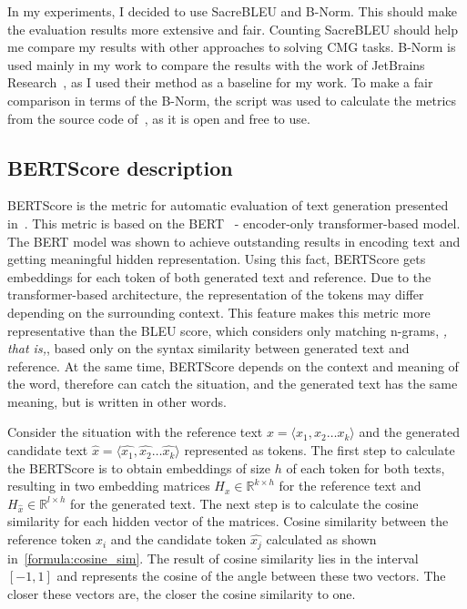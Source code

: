 In my experiments, I decided to use SacreBLEU and B-Norm. This should make the evaluation results more extensive and fair. Counting SacreBLEU should help me compare my results with other approaches to solving CMG tasks. B-Norm is used mainly in my work to compare the results with the work of JetBrains Research~\cite{eliseeva2023commit}, as I used their method as a baseline for my work. To make a fair comparison in terms of the B-Norm, the script was used to calculate the metrics from the source code of~\cite{eliseeva2023commit}, as it is open and free to use.

\subsection{BERTScore description}\label{subec:bertscore}
BERTScore is the metric for automatic evaluation of text generation presented in~\cite{zhang2019bertscore}. This metric is based on the BERT~\cite{devlin2018bert} {-} encoder-only transformer-based model. The BERT model was shown to achieve outstanding results in encoding text and getting meaningful hidden representation. Using this fact, BERTScore gets embeddings for each token of both generated text and reference. Due to the transformer-based architecture, the representation of the tokens may differ depending on the surrounding context. This feature makes this metric more representative than the BLEU score, which considers only matching n-grams, \textit{, that is,}, based only on the syntax similarity between generated text and reference. At the same time, BERTScore depends on the context and meaning of the word, therefore can catch the situation, and the generated text has the same meaning, but is written in other words.

Consider the situation with the reference text $x = \langle x_1, x_2 \dots x_k \rangle$ and the generated candidate text $\hat{x} = \langle \hat{x_1}, \hat{x_2} \dots \hat{x_k} \rangle$ represented as tokens. The first step to calculate the BERTScore is to obtain embeddings of size $h$ of each token for both texts, resulting in two embedding matrices $H_x \in \mathbb{R}^{k \times h}$ for the reference text and $H_{\hat{x}} \in \mathbb{R}^{l \times h}$ for the generated text. The next step is to calculate the cosine similarity for each hidden vector of the matrices. Cosine similarity between the reference token $x_i$ and the candidate token $\hat{x_j}$ calculated as shown in~\ref{formula:cosine_sim}. The result of cosine similarity lies in the interval $[-1, 1]$ and represents the cosine of the angle between these two vectors. The closer these vectors are, the closer the cosine similarity to one.

